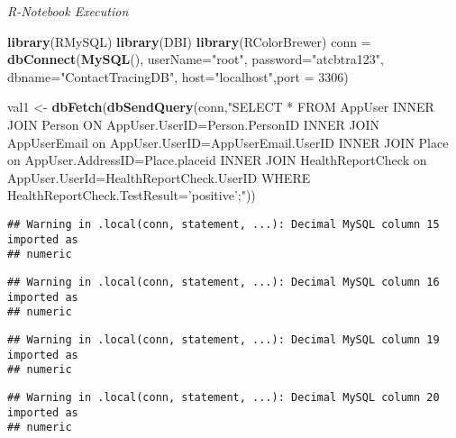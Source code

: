 \documentclass[
]{article}
\newenvironment{Shaded}{\begin{snugshade}}{\end{snugshade}}
\newcommand{\DataTypeTok}[1]{\textcolor[rgb]{0.13,0.29,0.53}{#1}}
\newcommand{\DecValTok}[1]{\textcolor[rgb]{0.00,0.00,0.81}{#1}}
\newcommand{\KeywordTok}[1]{\textcolor[rgb]{0.13,0.29,0.53}{\textbf{#1}}}
\newcommand{\NormalTok}[1]{#1}
\newcommand{\StringTok}[1]{\textcolor[rgb]{0.31,0.60,0.02}{#1}}
\begin{document}
\emph{R-Notebook Execution}

\begin{Shaded}
\begin{Highlighting}[]
\KeywordTok{library}\NormalTok{(RMySQL)}
\KeywordTok{library}\NormalTok{(DBI)}
\KeywordTok{library}\NormalTok{(RColorBrewer)}
\NormalTok{conn =}\StringTok{ }\KeywordTok{dbConnect}\NormalTok{(}\KeywordTok{MySQL}\NormalTok{(), }\DataTypeTok{userName=}\StringTok{"root"}\NormalTok{, }\DataTypeTok{password=}\StringTok{"atcbtra123"}\NormalTok{, }\DataTypeTok{dbname=}\StringTok{"ContactTracingDB"}\NormalTok{, }\DataTypeTok{host=}\StringTok{"localhost"}\NormalTok{,}\DataTypeTok{port =} \DecValTok{3306}\NormalTok{)}
\end{Highlighting}
\end{Shaded}

\begin{Shaded}
\begin{Highlighting}[]
\NormalTok{val1 <-}\StringTok{ }\KeywordTok{dbFetch}\NormalTok{(}\KeywordTok{dbSendQuery}\NormalTok{(conn,}\StringTok{"SELECT * FROM AppUser}
\StringTok{INNER JOIN Person ON AppUser.UserID=Person.PersonID}
\StringTok{INNER JOIN AppUserEmail on AppUser.UserID=AppUserEmail.UserID}
\StringTok{INNER JOIN Place on AppUser.AddressID=Place.placeid}
\StringTok{INNER JOIN HealthReportCheck on AppUser.UserId=HealthReportCheck.UserID}
\StringTok{WHERE HealthReportCheck.TestResult='positive';"}\NormalTok{))}
\end{Highlighting}
\end{Shaded}

\begin{verbatim}
## Warning in .local(conn, statement, ...): Decimal MySQL column 15 imported as
## numeric
\end{verbatim}

\begin{verbatim}
## Warning in .local(conn, statement, ...): Decimal MySQL column 16 imported as
## numeric
\end{verbatim}

\begin{verbatim}
## Warning in .local(conn, statement, ...): Decimal MySQL column 19 imported as
## numeric
\end{verbatim}

\begin{verbatim}
## Warning in .local(conn, statement, ...): Decimal MySQL column 20 imported as
## numeric
\end{verbatim}
\end{document}
